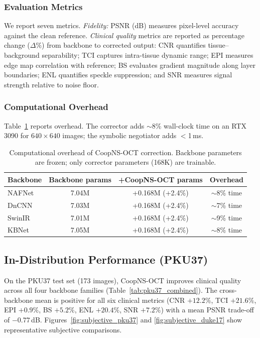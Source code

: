\documentclass[journal,twoside,web]{ieeecolor}
\begin{document}
\subsubsection{Evaluation Metrics}
\label{sec:metrics}
We report seven metrics. \emph{Fidelity:} PSNR (dB) measures pixel-level accuracy against the clean reference. \emph{Clinical quality} metrics are reported as percentage change ($\Delta\%$) from backbone to corrected output: CNR quantifies tissue--background separability; TCI captures intra-tissue dynamic range; EPI measures edge map correlation with reference; BS evaluates gradient magnitude along layer boundaries; ENL quantifies speckle suppression; and SNR measures signal strength relative to noise floor.

\subsubsection{Computational Overhead}
Table~\ref{tab:overhead} reports overhead. The corrector adds ${\sim}$8\% wall-clock time on an RTX 3090 for $640{\times}640$ images; the symbolic negotiator adds $<$1\,ms.

\begin{table}[t]
\centering
\caption{Computational overhead of CoopNS-OCT correction. Backbone parameters are frozen; only corrector parameters (168K) are trainable.}
\label{tab:overhead}
\setlength{\tabcolsep}{3pt}
\small
\begin{tabular}{lccc}
\toprule
Backbone & Backbone params & +CoopNS-OCT params & Overhead \\
\midrule
NAFNet & 7.04M & +0.168M (+2.4\%) & ${\sim}$8\% time \\
DnCNN & 7.03M & +0.168M (+2.4\%) & ${\sim}$7\% time \\
SwinIR & 7.01M & +0.168M (+2.4\%) & ${\sim}$9\% time \\
KBNet & 7.05M & +0.168M (+2.4\%) & ${\sim}$8\% time \\
\bottomrule
\end{tabular}
\end{table}

\subsection{In-Distribution Performance (PKU37)}
\label{sec:results_id}

On the PKU37 test set (173 images), CoopNS-OCT improves clinical quality across all four backbone families (Table~\ref{tab:pku37_combined}). The cross-backbone mean is positive for all six clinical metrics (CNR $+12.2\%$, TCI $+21.6\%$, EPI $+0.9\%$, BS $+5.2\%$, ENL $+20.4\%$, SNR $+7.2\%$) with a mean PSNR trade-off of $-0.77$\,dB. Figures~\ref{fig:subjective_pku37} and \ref{fig:subjective_duke17} show representative subjective comparisons.
\end{document}

